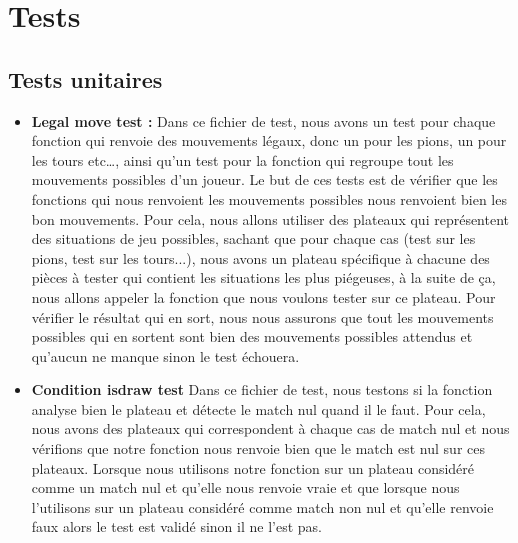 \documentclass{article}
\begin{document}
\medskip

\newpage
\section{Tests}
\subsection{Tests unitaires}

\begin{itemize}
    \item \textbf{Legal move test :} \newline
    Dans ce fichier de test, nous avons un test pour chaque fonction qui renvoie des mouvements légaux, donc un pour les pions, un pour les tours etc\dots , ainsi qu'un test pour la fonction qui regroupe tout les mouvements possibles d'un joueur.\newline
    Le but de ces tests est de vérifier que les fonctions qui nous renvoient les mouvements possibles nous renvoient bien les bon mouvements.\newline
    Pour cela, nous allons utiliser des plateaux qui représentent des situations de jeu possibles, sachant que pour chaque cas (test sur les pions, test sur les tours...), nous avons un plateau spécifique à chacune des pièces à tester qui contient les situations les plus piégeuses, à la suite de ça, nous allons appeler la fonction que nous voulons tester sur ce plateau.\newline
    Pour vérifier le résultat qui en sort, nous nous assurons que tout les mouvements possibles qui en sortent sont bien des mouvements possibles attendus et qu'aucun ne manque sinon le test échouera.\newline
    
    \item \textbf{Condition isdraw test}\newline
    Dans ce fichier de test, nous testons si la fonction analyse bien le plateau et détecte le match nul quand il le faut.\newline
    Pour cela, nous avons des plateaux qui correspondent à chaque cas de match nul et nous vérifions que notre fonction nous renvoie bien que le match est nul sur ces plateaux.\newline
    Lorsque nous utilisons notre fonction sur un plateau considéré comme un match nul et qu'elle nous renvoie vraie et que lorsque nous l'utilisons sur un plateau considéré comme match non nul et qu'elle renvoie faux alors le test est validé sinon il ne l'est pas.\newline
    

\end{itemize}
\end{document}
